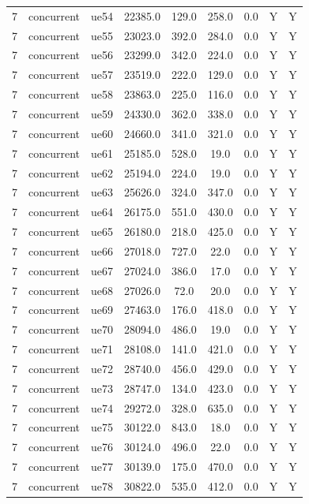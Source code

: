 \begin{table}[ht]
\begin{tabular}{|c|c|c|c|c|c|c|c|c|}
7 & concurrent & ue54 & 22385.0 & 129.0 & 258.0 & 0.0 & Y & Y \\
7 & concurrent & ue55 & 23023.0 & 392.0 & 284.0 & 0.0 & Y & Y \\
7 & concurrent & ue56 & 23299.0 & 342.0 & 224.0 & 0.0 & Y & Y \\
7 & concurrent & ue57 & 23519.0 & 222.0 & 129.0 & 0.0 & Y & Y \\
7 & concurrent & ue58 & 23863.0 & 225.0 & 116.0 & 0.0 & Y & Y \\
7 & concurrent & ue59 & 24330.0 & 362.0 & 338.0 & 0.0 & Y & Y \\
7 & concurrent & ue60 & 24660.0 & 341.0 & 321.0 & 0.0 & Y & Y \\
7 & concurrent & ue61 & 25185.0 & 528.0 & 19.0 & 0.0 & Y & Y \\
7 & concurrent & ue62 & 25194.0 & 224.0 & 19.0 & 0.0 & Y & Y \\
7 & concurrent & ue63 & 25626.0 & 324.0 & 347.0 & 0.0 & Y & Y \\
7 & concurrent & ue64 & 26175.0 & 551.0 & 430.0 & 0.0 & Y & Y \\
7 & concurrent & ue65 & 26180.0 & 218.0 & 425.0 & 0.0 & Y & Y \\
7 & concurrent & ue66 & 27018.0 & 727.0 & 22.0 & 0.0 & Y & Y \\
7 & concurrent & ue67 & 27024.0 & 386.0 & 17.0 & 0.0 & Y & Y \\
7 & concurrent & ue68 & 27026.0 & 72.0 & 20.0 & 0.0 & Y & Y \\
7 & concurrent & ue69 & 27463.0 & 176.0 & 418.0 & 0.0 & Y & Y \\
7 & concurrent & ue70 & 28094.0 & 486.0 & 19.0 & 0.0 & Y & Y \\
7 & concurrent & ue71 & 28108.0 & 141.0 & 421.0 & 0.0 & Y & Y \\
7 & concurrent & ue72 & 28740.0 & 456.0 & 429.0 & 0.0 & Y & Y \\
7 & concurrent & ue73 & 28747.0 & 134.0 & 423.0 & 0.0 & Y & Y \\
7 & concurrent & ue74 & 29272.0 & 328.0 & 635.0 & 0.0 & Y & Y \\
7 & concurrent & ue75 & 30122.0 & 843.0 & 18.0 & 0.0 & Y & Y \\
7 & concurrent & ue76 & 30124.0 & 496.0 & 22.0 & 0.0 & Y & Y \\
7 & concurrent & ue77 & 30139.0 & 175.0 & 470.0 & 0.0 & Y & Y \\
7 & concurrent & ue78 & 30822.0 & 535.0 & 412.0 & 0.0 & Y & Y \\

\end{tabular}
\end{table}
